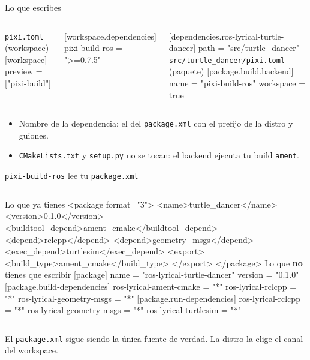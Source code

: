 \documentclass[aspectratio=169]{beamer}
\begin{document}
\begin{frame}[fragile]{Lo que escribes}
\begin{columns}[T]
\small \texttt{pixi.toml} (workspace)
[workspace]
preview = ["pixi-build"]

[workspace.dependencies]
pixi-build-ros = ">=0.7.5"

[dependencies.ros-lyrical-turtle-dancer]
path = "src/turtle_dancer"
\small \texttt{src/turtle\_dancer/pixi.toml} (paquete)
[package.build.backend]
name = "pixi-build-ros"
workspace = true
\end{columns}
\vfill
\begin{itemize}
    \item Nombre de la dependencia: el del \lstinline|package.xml| con el prefijo de la distro y guiones.
    \item \lstinline|CMakeLists.txt| y \lstinline|setup.py| no se tocan: el backend ejecuta tu build \texttt{ament}.
\end{itemize}
\end{frame}

\begin{frame}[fragile]{\texttt{pixi-build-ros} lee tu \texttt{package.xml}}
\begin{columns}[T]
\small Lo que ya tienes
<package format="3">
  <name>turtle_dancer</name>
  <version>0.1.0</version>
  <buildtool_depend>ament_cmake</buildtool_depend>
  <depend>rclcpp</depend>
  <depend>geometry_msgs</depend>
  <exec_depend>turtlesim</exec_depend>
  <export>
    <build_type>ament_cmake</build_type>
  </export>
</package>
\small Lo que \textbf{no} tienes que escribir
[package]
name = "ros-lyrical-turtle-dancer"
version = "0.1.0"
[package.build-dependencies]
ros-lyrical-ament-cmake = "*"
ros-lyrical-rclcpp = "*"
ros-lyrical-geometry-msgs = "*"
[package.run-dependencies]
ros-lyrical-rclcpp = "*"
ros-lyrical-geometry-msgs = "*"
ros-lyrical-turtlesim = "*"
\end{columns}
\vfill
\centering \small El \lstinline|package.xml| sigue siendo la única fuente de verdad. La distro la elige el canal del workspace.
\end{frame}
\end{document}
